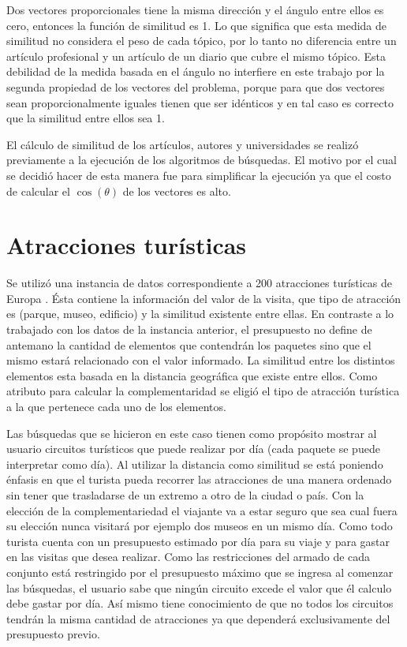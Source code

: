 Dos vectores proporcionales tiene la misma dirección y el ángulo entre ellos es cero, entonces la función de similitud es 1. Lo que significa que esta medida de similitud no considera el peso de cada tópico, por lo tanto no diferencia entre un artículo profesional y un artículo de un diario que cubre el mismo tópico. Esta debilidad de la medida basada en el ángulo no interfiere en este trabajo por la segunda propiedad de los vectores del problema, porque para que dos vectores sean proporcionalmente iguales tienen que ser idénticos y en tal caso es correcto que la similitud entre ellos sea 1.

El cálculo de similitud de los artículos, autores y universidades se realizó previamente a la ejecución de los algoritmos de búsquedas. El motivo por el cual se decidió hacer de esta manera fue para simplificar la ejecución ya que el costo de calcular el $\cos(\theta)$ de los vectores es alto.
\section{Atracciones turísticas}
Se utilizó una instancia de datos correspondiente a 200 atracciones turísticas de Europa \cite{turisticAtraction}. Ésta contiene la información del valor de la visita, que tipo de atracción es (parque, museo, edificio) y la similitud existente entre ellas. En contraste a lo trabajado con los datos de la instancia anterior, el presupuesto no define de antemano la cantidad de elementos que contendrán los paquetes sino que el mismo estará relacionado con el valor informado. La similitud entre los distintos elementos esta basada en la distancia geográfica que existe entre ellos. Como atributo para calcular la complementaridad se eligió el tipo de atracción turística a la que pertenece cada uno de los elementos.

Las búsquedas que se hicieron en este caso tienen como propósito mostrar al usuario circuitos turísticos que puede realizar por día (cada paquete se puede interpretar como día). Al utilizar la distancia como similitud se está poniendo énfasis en que el turista pueda recorrer las atracciones de una manera ordenado sin tener que trasladarse de un extremo a otro de la ciudad o país. Con la elección de la complementariedad el viajante va a estar seguro que sea cual fuera su elección nunca visitará por ejemplo dos museos en un mismo día. Como todo turista cuenta con un presupuesto estimado por día para su viaje y para gastar en las visitas que desea realizar. Como las restricciones del armado de cada conjunto está restringido por el presupuesto máximo que se ingresa al comenzar las búsquedas, el usuario sabe que ningún circuito excede el valor que él calculo debe gastar por día. Así mismo tiene conocimiento de que no todos los circuitos tendrán la misma cantidad de atracciones ya que dependerá exclusivamente del presupuesto previo.
